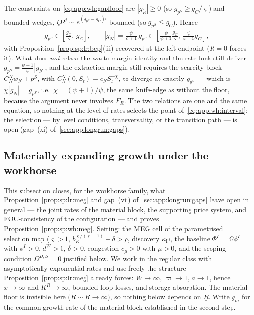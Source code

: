  The constraints
on~\eqref{eq:app:wh:gapfloor} are $\left|g_{\tilde R}\right|\ge0$ (so
$g_{p^S}\ge g_C/\varsigma$) and bounded wedges,
$\zeta\Omega^j\sim e^{\left(g_{p^S}-g_C\right)t}$ bounded (so $g_{p^S}\le g_C$). Hence
\begin{align}
g_{p^S}\in\left[\frac{g_C}{\varsigma},\,g_C\right],
\qquad
\left|g_N\right|=\frac{\psi}{\psi+1}\,g_{p^S}
\in\left[\frac{\psi}{\psi+1}\frac{g_C}{\varsigma},\,\frac{\psi}{\psi+1}g_C\right],
\label{eq:app:wh:interval}
\end{align}
with Proposition~\ref{prop:sp:lr:bcp}(iii) recovered at the left endpoint
($\underline R=0$ forces it). What does \emph{not} relax: the waste-margin identity and the
rate lock still deliver $g_{p^S}=\frac{\psi+1}{\psi}\left|g_N\right|$, and the extraction
margin still requires the scarcity block $C^N_Nw_N+p^S$, with
$C^N_N\left(0,S_t\right)=c_NS_t^{-\chi}$, to diverge at exactly $g_{p^S}$ --- which is
$\chi\left|g_N\right|=g_{p^S}$, i.e.\ $\chi=\left(\psi+1\right)/\psi$, the same knife-edge as
without the floor, because the argument never involves $F_R$. The two relations are one and
the same equation, so nothing at the level of rates selects the point
of~\eqref{eq:app:wh:interval}: the selection --- by level conditions, transversality, or the
transition path --- is open (gap~(xi) of~\ref{sec:app:longrun:gaps}).

\subsection{Materially expanding growth under the workhorse}\label{sec:app:workhorse:meg}

This subsection closes, for the workhorse family, what Proposition~\ref{prop:sp:lr:meg} and
gap~(vii) of~\ref{sec:app:longrun:gaps} leave open in general --- the joint rates of the
material block, the supporting price system, and FOC-consistency of the configuration --- and
proves Proposition~\ref{prop:sp:wh:meg}. Setting: the MEG cell of the parametrised selection
map ($\varsigma>1$, $b_K^{\varsigma/\left(\varsigma-1\right)}-\delta>\rho$, discovery
$\kappa_{\mathrm I}$), the baseline $\Phi^I=\Omega\phi^I$ with $\phi^I>0$, $d^W>0$,
$\delta>0$, congestion $c_\mu>0$ with $\mu>0$, and the scoping condition $\Omega^{D,S}=0$
justified below. We work in the regular class with asymptotically exponential rates and use
freely the structure Proposition~\ref{prop:sp:lr:meg} already forces: $W\to\infty$,
$\varpi\to1$, $a\to1$, hence $x\to\infty$ and $K^R\to\infty$, bounded loop losses, and
storage absorption. The material floor is invisible here ($\tilde R\sim R\to\infty$), so
nothing below depends on $\underline R$. Write $g_m$ for the common growth rate of the
material block established in the second step.

